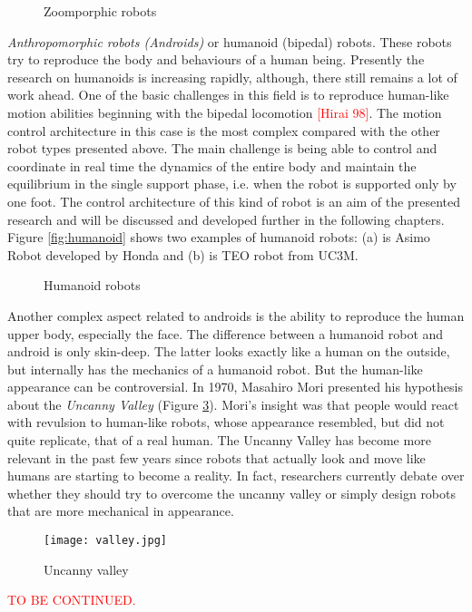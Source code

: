 \begin{figure}[!hbt]
\centering 
{}\hspace{10mm}
\caption{Zoomporphic robots}
\label{fig:zoo}
\end{figure}

\textit{Anthropomorphic robots (Androids)} or humanoid (bipedal) robots. These robots try to reproduce the body and behaviours of a human being. Presently the research on humanoids is increasing rapidly, although, there still remains a lot of work ahead. One of the basic challenges in this field is to reproduce human-like motion abilities beginning with the bipedal locomotion \textcolor{red}{[Hirai 98]}. The motion control architecture in this case is the most complex compared with the other robot types presented above. The main challenge is being able to control and coordinate in real time the dynamics of the entire body and maintain the equilibrium in the single support phase, i.e. when the robot is supported only by one foot. The control architecture of this kind of robot is an aim of the presented research and will be discussed and developed further in the following chapters. Figure \ref{fig:humanoid} shows two examples of humanoid robots: (a) is Asimo Robot developed by Honda and (b) is TEO robot from UC3M.

\begin{figure}[!hbt]
\centering 
{}\hspace{10mm}
\caption{Humanoid robots}
\label{fig:zoo}
\end{figure}


Another complex aspect related to androids is the ability to reproduce the human upper body, especially the face. The difference between a humanoid robot and android is only skin-deep. The latter looks exactly like a human on the outside, but internally has the mechanics of a humanoid robot. But the human-like appearance can be controversial. In 1970, Masahiro Mori presented his hypothesis about the \textit{Uncanny Valley} (Figure \ref{fig:valley}). Mori's insight was that people would react with revulsion to human-like robots, whose appearance resembled, but did not quite replicate, that of a real human. The Uncanny Valley has become more relevant in the past few years since robots that actually look and move like humans are starting to become a reality. In fact, researchers currently debate over whether they should try to overcome the uncanny valley or simply design robots that are more mechanical in appearance.

\begin{figure}[!hbt]
\centering
\texttt{[image: valley.jpg]}
\caption{Uncanny valley}
\label{fig:valley}
\end{figure}
\textcolor{red}{TO BE CONTINUED.}